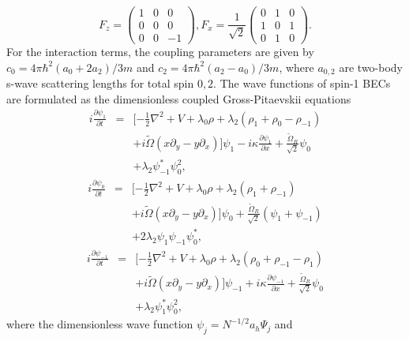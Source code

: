 \documentclass[aps,pra,showpacs,twocolumn,superscriptaddress]{revtex4-1}
\begin{document}
\begin{equation}
F_z={
\left( \begin{array}{ccc}
1 & 0 & 0\\
0 & 0 & 0\\
0 & 0 & -1
\end{array}
\right )},
F_x=\frac{1}{\sqrt{2}}{
\left( \begin{array}{ccc}
0 & 1 & 0\\
1 & 0 & 1\\
0 & 1 & 0
\end{array}
\right ).}
\end{equation}
For the interaction terms, the coupling parameters
are given by $c_{0} = 4\pi\hbar^{2}(a_{0}+2a_{2})/3m$ and $c_{2} = 4\pi\hbar^{2}(a_{2}-a_{0})/3m$,
where $a_{0,2}$ are two-body s-wave
scattering lengths for total spin $0,2$. The wave functions of spin-1 BECs are formulated as the dimensionless
coupled Gross-Pitaevskii equations \cite{Ji2008,Liu2012,Gautam2014,Martikainen2002,Mizushima2004}
\begin{eqnarray}
i\frac{\partial\psi_{1}}{\partial t}&=&[-\frac{1}{2}\nabla^{2}+V+\lambda_{0}\rho+\lambda_{2}(\rho_{1}+\rho_{0}-\rho_{-1}) \nonumber\\
&&+i\tilde{\Omega}(x\partial_{y}-y\partial_{x})]\psi_{1}-i\kappa\frac{\partial\psi_{1}}{\partial x}+\frac{\tilde{\Omega}_{R}}{\sqrt{2}}\psi_{0} \nonumber\\
&&+\lambda_{2}\psi^{\ast}_{-1}\psi_{0}^{2},
\end{eqnarray}
\begin{eqnarray}
i\frac{\partial\psi_{0}}{\partial t}&=&[-\frac{1}{2}\nabla^{2}+V+\lambda_{0}\rho+\lambda_{2}(\rho_{1}+\rho_{-1}) \nonumber\\
&&+i\tilde{\Omega}(x\partial_{y}-y\partial_{x})]\psi_{0}+\frac{\tilde{\Omega}_{R}}{\sqrt{2}}(\psi_{1}+\psi_{-1}) \nonumber\\
&&+2\lambda_{2}\psi_{1}\psi_{-1}\psi_{0}^{\ast},
\end{eqnarray}
\begin{eqnarray}
i\frac{\partial\psi_{-1}}{\partial t}&=&[-\frac{1}{2}\nabla^{2}+V+\lambda_{0}\rho+\lambda_{2}(\rho_{0}+\rho_{-1}-\rho_{1}) \nonumber\\
&&+i\tilde{\Omega}(x\partial_{y}-y\partial_{x})]\psi_{-1}+i\kappa\frac{\partial\psi_{-1}}{\partial x}+\frac{\tilde{\Omega}_{R}}{\sqrt{2}}\psi_{0} \nonumber\\
&&+\lambda_{2}\psi_{1}^{\ast}\psi_{0}^{2},
\end{eqnarray}
where the dimensionless wave function $\psi_{j}=N^{-1/2}a_{h}\Psi_{j}$ and
\end{document}
